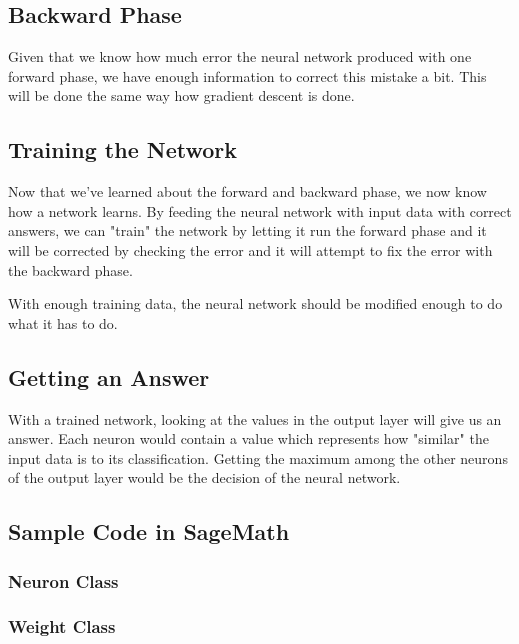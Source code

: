 \documentclass[a4paper, 11pt, english]{article}
\begin{document}
\subsection{Backward Phase}
\par Given that we know how much error the neural network produced with one forward phase, we have enough information to correct this mistake a bit. This will be done the same way how gradient descent is done. %

\subsection{Training the Network}
\par Now that we've learned about the forward and backward phase, we now know how a network learns. By feeding the neural network with input data with correct answers, we can "train" the network by letting it run the forward phase and it will be corrected by checking the error and it will attempt to fix the error with the backward phase.
\par With enough training data, the neural network should be modified enough to do what it has to do.

\subsection{Getting an Answer}
\par With a trained network, looking at the values in the output layer will give us an answer. Each neuron would contain a value which represents how "similar" the input data is to its classification. Getting the maximum among the other neurons of the output layer would be the decision of the neural network.

\subsection{Sample Code in SageMath}
\subsubsection{Neuron Class}

\subsubsection{Weight Class}

\end{document}
